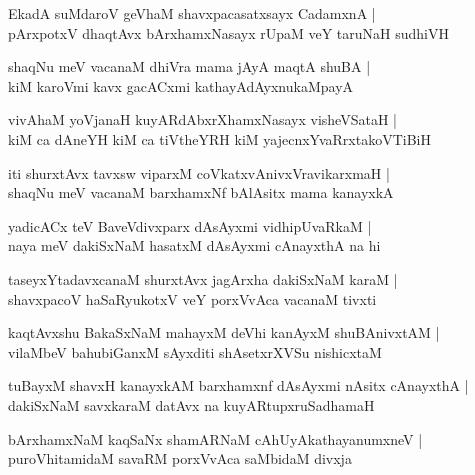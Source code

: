 \begin{shloka}
EkadA suMdaroV geVhaM shavxpacasatxsayx CadamxnA |\\
pArxpotxV dhaqtAvx bArxhamxNasayx rUpaM veY taruNaH sudhiVH
\end{shloka}

\begin{shloka}
shaqNu meV vacanaM dhiVra mama jAyA maqtA shuBA |\\
kiM karoVmi kavx gacACxmi kathayAdAyxnukaMpayA
\end{shloka}

\begin{shloka}
vivAhaM yoVjanaH kuyARdAbxrXhamxNasayx visheVSataH |\\
kiM ca dAneYH kiM ca tiVtheYRH kiM yajecnxYvaRrxtakoVTiBiH
\end{shloka}

\begin{shloka}
iti shurxtAvx tavxsw viparxM coVkatxvAnivxVravikarxmaH |\\
shaqNu meV vacanaM barxhamxNf bAlAsitx mama kanayxkA
\end{shloka}

\begin{shloka}
yadicACx teV BaveVdivxparx dAsAyxmi vidhipUvaRkaM |\\
naya meV dakiSxNaM hasatxM dAsAyxmi cAnayxthA na hi
\end{shloka}

\begin{shloka}
taseyxYtadavxcanaM shurxtAvx jagArxha dakiSxNaM karaM |\\
shavxpacoV haSaRyukotxV veY porxVvAca vacanaM tivxti
\end{shloka}

\begin{shloka}
kaqtAvxshu BakaSxNaM mahayxM deVhi kanAyxM shuBAnivxtAM |\\
vilaMbeV bahubiGanxM sAyxditi shAsetxrXVSu nishicxtaM
\end{shloka}

\begin{shloka}
tuBayxM shavxH kanayxkAM barxhamxnf dAsAyxmi nAsitx cAnayxthA |\\
dakiSxNaM savxkaraM datAvx na kuyARtupxruSadhamaH
\end{shloka}

\begin{shloka}
bArxhamxNaM kaqSaNx shamARNaM cAhUyAkathayanumxneV |\\
puroVhitamidaM savaRM porxVvAca saMbidaM divxja
\end{shloka}

